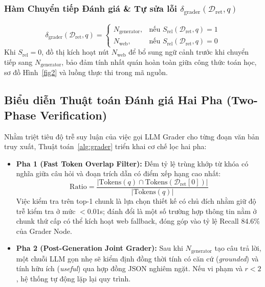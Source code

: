 \documentclass[conference]{IEEEtran}
\begin{document}
\subsubsection{Hàm Chuyển tiếp Đánh giá \& Tự sửa lỗi \texorpdfstring{$\delta_{\text{grader}}(\mathcal{D}_{\text{ret}}, q)$}{delta\_grader(D\_ret, q)}}
\begin{equation}
\delta_{\text{grader}}(\mathcal{D}_{\text{ret}}, q) = 
\begin{cases} 
N_{\text{generator}}, & \text{nếu } S_{\text{rel}}(\mathcal{D}_{\text{ret}}, q) = 1 \\ 
N_{\text{web}}, & \text{nếu } S_{\text{rel}}(\mathcal{D}_{\text{ret}}, q) = 0 
\end{cases}
\end{equation}
Khi $S_{\text{rel}} = 0$, đồ thị kích hoạt nút $N_{\text{web}}$ để bổ sung ngữ cảnh trước khi chuyển tiếp sang $N_{\text{generator}}$, bảo đảm tính nhất quán hoàn toàn giữa công thức toán học, sơ đồ Hình~\ref{fig2} và luồng thực thi trong mã nguồn.

\subsection{Biểu diễn Thuật toán Đánh giá Hai Pha (Two-Phase Verification)}
Nhằm triệt tiêu độ trễ suy luận của việc gọi LLM Grader cho từng đoạn văn bản truy xuất, Thuật toán~\ref{alg:grader} triển khai cơ chế lọc hai pha:
\begin{itemize}
    \item \textbf{Pha 1 (Fast Token Overlap Filter):} Đếm tỷ lệ trùng khớp từ khóa có nghĩa giữa câu hỏi và đoạn trích dẫn có điểm xếp hạng cao nhất:
    \begin{equation}
    \text{Ratio} = \frac{\bigl|\text{Tokens}(q) \cap \text{Tokens}(\mathcal{D}_{\text{ret}}[0])\bigr|}{\bigl|\text{Tokens}(q)\bigr|}
    \end{equation}
    Việc kiểm tra trên top-1 chunk là lựa chọn thiết kế có chủ đích nhằm giữ độ trễ kiểm tra ở mức $< 0.01$s; đánh đổi là một số trường hợp thông tin nằm ở chunk thứ cấp có thể kích hoạt web fallback, đóng góp vào tỷ lệ Recall 84.6\% của Grader Node.
    \item \textbf{Pha 2 (Post-Generation Joint Grader):} Sau khi $N_{\text{generator}}$ tạo câu trả lời, một chuỗi LLM gọn nhẹ sẽ kiểm định đồng thời tính có căn cứ (\textit{grounded}) và tính hữu ích (\textit{useful}) qua hợp đồng JSON nghiêm ngặt. Nếu vi phạm và $r < 2$, hệ thống tự động lặp lại quy trình.
\end{itemize}
\end{document}
